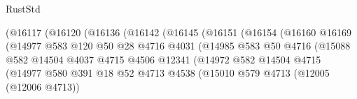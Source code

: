 \begin{lexlean}{RustStd}
\begin{coremodule}
                                    (@16117
                                      (@16120
                                        (@16136
                                          (@16142
                                            (@16145
                                              (@16151
                                                (@16154
                                                  (@16160
                                                    @16169
                                                    (@14977
                                                      @583
                                                      @120
                                                      @50
                                                      @28
                                                      @4716
                                                      @4031
                                                      (@14985
                                                        @583
                                                        @50
                                                        @4716
                                                        (@15088
                                                          @582
                                                          @14504
                                                          @4037
                                                          @4715
                                                          @4506
                                                          @12341
                                                          (@14972
                                                            @582
                                                            @14504
                                                            @4715
                                                            (@14977
                                                              @580
                                                              @391
                                                              @18
                                                              @52
                                                              @4713
                                                              @4538
                                                              (@15010
                                                                @579
                                                                @4713
                                                                (@12005 (@12006 @4713))

\end{coremodule}
\end{lexlean}
